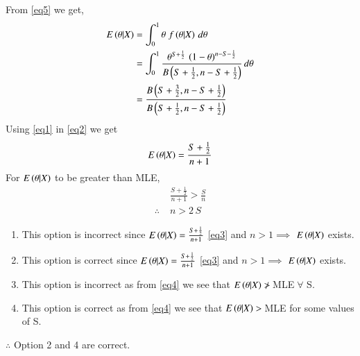 \documentclass[journal,12pt,twocolumn]{IEEEtran}
\begin{document}
From \eqref{eq5} we get,
\begin{align}
    E\left(\theta|X\right) &= \int_0^1 \theta\;f\left(\theta|X\right)\,d\theta\nonumber\\
    &=\int_0^1 \frac{\theta^{S+\frac{1}{2}}\,\left(1-\theta\right)^{n-S-\frac{1}{2}}}{B\left(S+\frac{1}{2},n-S+\frac{1}{2}\right)}\,d\theta\nonumber\\
    &=\frac{B\left(S+\frac{3}{2},n-S+\frac{1}{2}\right)}{B\left(S+\frac{1}{2},n-S+\frac{1}{2}\right)}\label{eq2}
\end{align}
Using \eqref{eq1} in \eqref{eq2} we get
\begin{align}
    E\left(\theta|X\right) = \frac{S+\frac{1}{2}}{n+1}\label{eq3}
\end{align}
For $E\left(\theta|X\right)$ to be greater than MLE,
\begin{align}
    &\frac{S+\frac{1}{2}}{n+1} > \frac{S}{n}\nonumber\\
     \therefore\;&n>2\,S\label{eq4}
\end{align}
\begin{enumerate}
    \item This option is incorrect since $E\left(\theta|X\right) = \frac{S+\frac{1}{2}}{n+1}$ \eqref{eq3} and $n>1\implies$ $E\left(\theta|X\right)$ exists.
    \item This option is correct since $E\left(\theta|X\right) = \frac{S+\frac{1}{2}}{n+1}$ \eqref{eq3} and $n>1\implies$ $E\left(\theta|X\right)$ exists.
    \item This option is incorrect as from \eqref{eq4} we see that $E\left(\theta|X\right)\ngtr\, $MLE$\;\forall$ S.
    \item This option is correct as from \eqref{eq4} we see that $E\left(\theta|X\right)>\, $MLE for some values of S.
\end{enumerate}
$\therefore$ Option 2 and 4 are correct.\\
\end{document}
